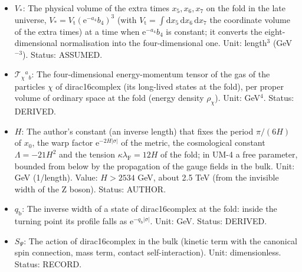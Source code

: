 \documentclass[
  10pt,
]{article}
\begin{document}
\begin{itemize}
\item
  \(V_*\): The physical volume of the extra times \(x_5, x_6, x_7\) on
  the fold in the late universe,
  \(V_* = V_{\mathrm{t}}(\mathrm{e}^{-a_4}b_4)^3\) (with
  \(V_{\mathrm{t}} = \int\mathrm{d}x_5\,\mathrm{d}x_6\,\mathrm{d}x_7\)
  the coordinate volume of the extra times) at a time when
  \(\mathrm{e}^{-a_4}b_4\) is constant; it converts the
  eight-dimensional normalisation into the four-dimensional one. Unit:
  length\(^3\) (GeV\(^{-3}\)). Status: ASSUMED.
\item
  \(\mathcal{T}_\chi{}^a{}_b\): The four-dimensional energy-momentum
  tensor of the gas of the particles \(\chi\) of dirac16complex (its
  long-lived states at the fold), per proper volume of ordinary space at
  the fold (energy density \(\rho_\chi\)). Unit: GeV\(^4\). Status:
  DERIVED.
\item
  \(H\): The author's constant (an inverse length) that fixes the period
  \(\pi/(6H)\) of \(x_0\), the warp factor
  \(\mathrm{e}^{-2H\lvert\sigma\rvert}\) of the metric, the cosmological
  constant \(\Lambda = -21H^2\) and the tension
  \(\kappa\lambda_{\mathrm{F}} = 12H\) of the fold; in UM-4 a free
  parameter, bounded from below by the propagation of the gauge fields
  in the bulk. Unit: GeV (1/length). Value: \(H > 2534\) GeV, about 2.5
  TeV (from the invisible width of the Z boson). Status: AUTHOR.
\item
  \(q_{\mathrm{b}}\): The inverse width of a state of dirac16complex at
  the fold: inside the turning point its profile falls as
  \(\mathrm{e}^{-q_{\mathrm{b}}\lvert\sigma\rvert}\). Unit: GeV. Status:
  DERIVED.
\item
  \(S_\Psi\): The action of dirac16complex in the bulk (kinetic term
  with the canonical spin connection, mass term, contact
  self-interaction). Unit: dimensionless. Status: RECORD.
\end{itemize}
\end{document}
